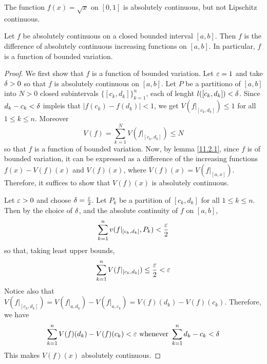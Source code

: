 \begin{example}\label{example_11.3}
    The function $f(x)=\sqrt{x}$ on $[0,1]$ is absolutely continuous, but not
    Lipschitz continuous.
\end{example}

\begin{theorem}\label{11.3.3}
    Let $f$ be absolutely continuous on a closed bounded interval  $[a,b]$. Then
    $f$ is the difference of absolutely continuous increasing functions on
    $[a,b]$. In particular, $f$ is a function of bounded variation.
\end{theorem}
\begin{proof}
    We first show that $f$ is a function of bounded variation. Let  $\varepsilon=1$ and
    take $\delta>0$ so that $f$ is absolutely continuous on $[a,b]$. Let $P$ be a
    partitiono of $[a,b]$ into $N>0$ closed subintervals
    $\{[c_k,d_k]\}_{k=1}^n$, each of lenght $l([c_k,d_k])<\delta$. Since
    $d_k-c_k<\delta$ impleis that  $|f(c_k)-f(d_k)|<1$, we get $V(f|_{[c_k,d_k]})
    \leq 1$ for all $1 \leq k \leq n$. Moreover
    \begin{equation*}
        V(f)=\sum_{k=1}^N{V(f|_{[c_k,d_k]})} \leq N
    \end{equation*}
    so that $f$ is a function of bounded variation. Now, by lemma \ref{11.2.1},
    since $f$ is of bounded variation, it can be expressed as a difference of
    the increasing functions $f(x)-V(f)(x)$ and $V(f)(x)$, where
    $V(f)(x)=V(f|_{[a,x]})$. Therefore, it suffices to show that $V(f)(x)$ is
    absolutely continuous.

    Let $\varepsilon>0$ and choose  $\delta=\frac{\varepsilon}{2}$. Let $P_k$ be a partition of
    $[c_k,d_k]$ for all $1 \leq k \leq n$. Then by the choice of $\delta$, and the
    absolute continuity of $f$ on  $[a,b]$,
    \begin{equation*}
        \sum_{k=1}^n{v(f|_{[c_k,d_k]},P_k)}<\frac{\varepsilon}{2}
    \end{equation*}
    so that, taking least upper bounds,
    \begin{equation*}
        \sum_{k=1}^n{V(f|_{[c_k,d_k]})} \leq \frac{\varepsilon}{2}<\varepsilon
    \end{equation*}
    Notice also that $V(f|_{[c_k,d_k]})=V(f|_{a,d_k})-V(f|_{a,c_k})=
    V(f)(d_k)-V(f)(c_k)$. Therefore, we have
    \begin{equation*}
        \sum_{k=1}^n{V(f)(d_k)-V(f)(c_k)}<\varepsilon \text{ whenever }
        \sum_{k=1}^n{d_k-c_k}<\delta
    \end{equation*}
    This makes $V(f)(x)$ absolutely continuous.
\end{proof}

